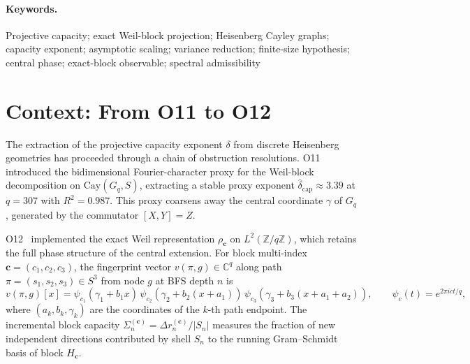 \documentclass[11pt,a4paper]{article}
\theoremstyle{plain}
\theoremstyle{definition}
\newcommand{\Gq}{G_q}
\begin{document}
  \paragraph{Keywords.}
    Projective capacity; exact Weil-block projection; Heisenberg Cayley graphs;
    capacity exponent; asymptotic scaling; variance reduction; finite-size hypothesis;
    central phase; exact-block observable; spectral admissibility

    \clearpage
    \tableofcontents

    \clearpage

  \section{Context: From O11 to O12}
  \label{sec:context}

  The extraction of the projective capacity exponent $\delta$ from discrete
  Heisenberg geometries has proceeded through a chain of obstruction resolutions.
  O11~\cite{Beau2026a15} introduced the bidimensional Fourier-character proxy
  for the Weil-block decomposition on $\mathrm{Cay}(\Gq, S)$, extracting a
  stable proxy exponent $\hat\delta_{\mathrm{cap}} \approx 3.39$ at $q = 307$
  with $R^2 = 0.987$.
  This proxy coarsens away the central coordinate $\gamma$ of $\Gq$, generated
  by the commutator $[X, Y] = Z$.

  O12~\cite{Beau2026a16} implemented the exact Weil representation $\rho_{\mathbf{c}}$
  on $L^2(\mathbb{Z}/q\mathbb{Z})$, which retains the full phase structure of the
  central extension.
  For block multi-index $\mathbf{c} = (c_1, c_2, c_3)$, the fingerprint vector
  $v(\pi, g) \in \mathbb{C}^q$ along path $\pi = (s_1, s_2, s_3) \in S^3$ from
  node $g$ at BFS depth $n$ is
  \begin{equation}
    v(\pi, g)[x]
    = \psi_{c_1}(\gamma_1 + b_1 x)\,
    \psi_{c_2}(\gamma_2 + b_2(x+a_1))\,
    \psi_{c_3}(\gamma_3 + b_3(x+a_1+a_2)),
    \qquad \psi_c(t) = e^{2\pi ict/q},
    \label{eq:fingerprint}
  \end{equation}
  where $(a_k, b_k, \gamma_k)$ are the coordinates of the $k$-th path endpoint.
  The incremental block capacity
  $\Sigma_n^{(\mathbf{c})} = \Delta r_n^{(\mathbf{c})}/|S_n|$
  measures the fraction of new independent directions contributed by shell $S_n$
  to the running Gram--Schmidt basis of block $H_{\mathbf{c}}$.
\end{document}
